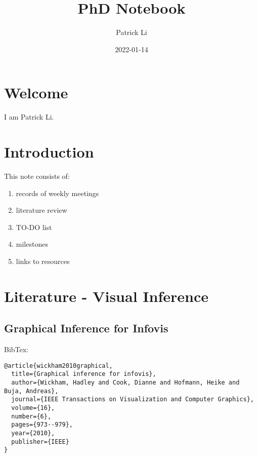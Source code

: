 \documentclass[
]{book}
\title{PhD Notebook}
\author{Patrick Li}
\date{2022-01-14}
\providecommand{\tightlist}{%
  \setlength{\itemsep}{0pt}\setlength{\parskip}{0pt}}
\begin{document}
\maketitle

{
\setcounter{tocdepth}{1}
\tableofcontents
}
\hypertarget{welcome}{%
\chapter{Welcome}\label{welcome}}

I am Patrick Li.

\hypertarget{introduction}{%
\chapter{Introduction}\label{introduction}}

This note consists of:

\begin{enumerate}
\def\labelenumi{\arabic{enumi}.}
\tightlist
\item
  records of weekly meetings
\item
  literature review
\item
  TO-DO list
\item
  milestones
\item
  links to resources
\end{enumerate}

\hypertarget{literature---visual-inference}{%
\chapter{Literature - Visual Inference}\label{literature---visual-inference}}

\hypertarget{graphical-inference-for-infovis}{%
\section{Graphical Inference for Infovis}\label{graphical-inference-for-infovis}}

BibTex:

\begin{verbatim}
@article{wickham2010graphical,
  title={Graphical inference for infovis},
  author={Wickham, Hadley and Cook, Dianne and Hofmann, Heike and Buja, Andreas},
  journal={IEEE Transactions on Visualization and Computer Graphics},
  volume={16},
  number={6},
  pages={973--979},
  year={2010},
  publisher={IEEE}
}
\end{verbatim}
\end{document}

